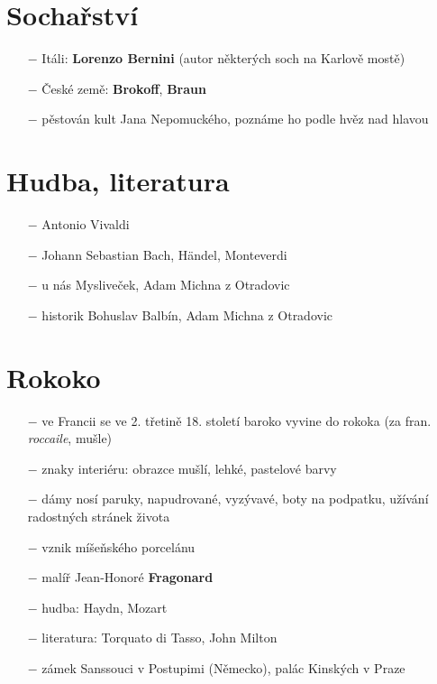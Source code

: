 \documentclass{article}
\begin{document}
\section*{Sochařství}
\begin{itemize}
    \vspace{-0.5em}
    \setlength\itemsep{0.15em}
    \item[$-$] Itáli: \textbf{Lorenzo Bernini} (autor některých soch na Karlově mostě)
    \item[$-$] České země: \textbf{Brokoff}, \textbf{Braun}
    \item[$-$] pěstován kult Jana Nepomuckého, poznáme ho podle hvěz nad hlavou
\end{itemize}

\section*{Hudba, literatura}
\begin{itemize}
    \vspace{-0.5em}
    \setlength\itemsep{0.15em}
    \item[$-$] Antonio Vivaldi
    \item[$-$] Johann Sebastian Bach, Händel, Monteverdi
    \item[$-$] u nás Mysliveček, Adam Michna z Otradovic
    \item[$-$] historik Bohuslav Balbín, Adam Michna z Otradovic
\end{itemize}

\section*{Rokoko}
\begin{itemize}
    \vspace{-0.5em}
    \setlength\itemsep{0.15em}
    \item[$-$] ve Francii se ve 2. třetině 18. století baroko vyvine do rokoka (za fran. \textit{roccaile}, mušle)
    \item[$-$] znaky interiéru: obrazce mušlí, lehké, pastelové barvy
    \item[$-$] dámy nosí paruky, napudrované, vyzývavé, boty na podpatku, užívání radostných stránek života
    \item[$-$] vznik míšeňského porcelánu
    \item[$-$] malíř Jean-Honoré \textbf{Fragonard}
    \item[$-$] hudba: Haydn, Mozart
    \item[$-$] literatura: Torquato di Tasso, John Milton
    \item[$-$] zámek Sanssouci v Postupimi (Německo), palác Kinských v Praze
\end{itemize}
\end{document}
